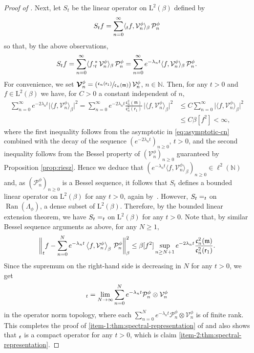 \documentclass[11pt]{article}
\makeatletter
\numberwithin{equation}{section}
\newcommand{\Psfrac}[2]{(\sfrac{#1}{#2})}
\DeclareRobustCommand{\mathds}[1]{\csname jepbb@#1\endcsname}
\theoremstyle{plain}
\theoremstyle{definition}
\newcommand{\bbnorm}[1]{\biggl\lVert#1\biggr\rVert}
\DeclareMathOperator{\Ran}{Ran}
\newcommand{\N}{\mathbb{N}}
\renewcommand{\P}{\mathcal{P}}
\newcommand{\V}{\mathcal{V}}
\newcommand{\J}{\mathds{Q}}
\newcommand{\Leb}{\mathrm{L}}
\newcommand{\m}{\mathfrak{m}}
\newcommand{\vat}{{\mathsf{r}_1}}
\let\bpsi\beta
\makeatother
\begin{document}
\begin{proof}[Proof of ]
Next, let $S_t$ be the linear operator on $\Leb^2(\bpsi)$ defined by
\begin{equation*}
S_t f = \sum_{n=0}^\infty \langle \J_t f, \V_n^\phi \rangle_{\bpsi}\, \P_n^\phi
\end{equation*}
so that, by the above observations,
\begin{equation*}
S_t f = \sum_{n=0}^\infty \langle f, \J_t^* \V_n^\phi \rangle_{\bpsi}\, \P_n^\phi = \sum_{n=0}^\infty e^{-\lambda_n t} \langle f, \V_n^\phi \rangle_{\bpsi}\, \P_n^\phi.
\end{equation*}
For convenience, we set ${\bm{\V}}_n^\phi = \Psfrac{\mathfrak{c}_n(\vat)}{\mathfrak{c}_n(\m)}\, \V_n^\phi$, $n \in \N$. Then, for any $t > 0$ and $f \in \Leb^2(\bpsi)$ we have, for $C >0$ a constant independent of $n$,
\begin{align*}
\sum_{n=0}^\infty e^{-2\lambda_n t} \bigl|\bigl\langle f, \V_n^\phi \bigr\rangle_{\bpsi}\bigr|^2 = \sum_{n=0}^\infty e^{-2 \lambda_n t} \frac{\mathfrak{c}_n^2(\m)}{\mathfrak{c}_n^2(\vat)}\, \bigl|\bigl\langle f, {\bm{\V}}_n^\phi\bigr\rangle_{\bpsi}\bigr|^2 &\leq C \sum_{n=0}^\infty \bigl|\bigl\langle f, {\bm{\V}}_n^\phi \bigr\rangle_{\bpsi}\bigr|^2\\
&\leq C \bpsi [f^2] < \infty,
\end{align*}
where the first inequality follows from the asymptotic in \eqref{eq:asymptotic-cn} combined with the decay of the sequence $(e^{-2\lambda_n t})_{n \geq 0}$, $t > 0$, and the second inequality follows from the Bessel property of $({\bm{\V}}_n^\phi )_{n \geq 0}$ guaranteed by Proposition \ref{prop:riesz}. Hence we deduce that $\left(e^{-\lambda_n t} \langle f, \V_n^\phi \rangle_{\bpsi}\right)_{n \geq 0} \in \ell^2(\N)$ and, as $(\P_n^\phi)_{n \geq 0}$ is a Bessel sequence, it follows that $S_t$ defines a bounded linear operator on $\Leb^2(\bpsi)$ for any $t > 0$, again by~\cite[Th.\,3.1.3]{Christensen2003a}. However, $S_t = \J_t$ on $\Ran(\Lambda_\phi)$, a dense subset of $\Leb^2(\bpsi)$. Therefore, by the bounded linear extension theorem, we have $S_t = \J_t$ on $\Leb^2(\bpsi)$ for any $t > 0$. Note that, by similar Bessel sequence arguments as above, for any $N \geq 1$,
\begin{equation*}
\bbnorm{\J_tf -\sum_{n=0}^N e^{-\lambda_n t} \left\langle f, \V_n^\phi \right\rangle_{\bpsi}\, \P_n^\phi}_\bpsi^2 \leq \bpsi [f^2] \sup_{n \geq N+1} e^{-2 \lambda_n t} \frac{\mathfrak{c}_n^2(\m)}{\mathfrak{c}_n^2(\vat)}.
\end{equation*}
Since the supremum on the right-hand side is decreasing in $N$ for any $t > 0$, we get
\begin{equation*}
\J_t = \lim_{N \to \infty} \sum_{n=0}^N e^{-\lambda_n t} \P_n^\phi \otimes \V_n^\phi
\end{equation*}
in the operator norm topology, where each $\sum_{n=0}^N e^{-\lambda_n t} \P_n^\phi \otimes \V_n^\phi$ is of finite rank. This completes the proof of \eqref{item-1:thm:spectral-representation} of  and also shows that $\J_t$ is a compact operator for any $t > 0$, which is claim \eqref{item-2:thm:spectral-representation}.


\end{proof}
\end{document}
